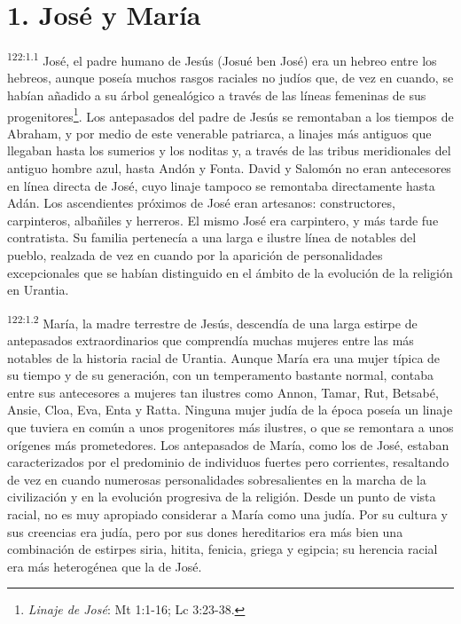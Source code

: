 \section*{1. José y María}
\par 
\textsuperscript{122:1.1} José, el padre humano de Jesús (Josué ben José) era un hebreo entre los hebreos, aunque poseía muchos rasgos raciales no judíos que, de vez en cuando, se habían añadido a su árbol genealógico a través de las líneas femeninas de sus progenitores\footnote{\textit{Linaje de José}: Mt 1:1-16; Lc 3:23-38.}. Los antepasados del padre de Jesús se remontaban a los tiempos de Abraham, y por medio de este venerable patriarca, a linajes más antiguos que llegaban hasta los sumerios y los noditas y, a través de las tribus meridionales del antiguo hombre azul, hasta Andón y Fonta. David y Salomón no eran antecesores en línea directa de José, cuyo linaje tampoco se remontaba directamente hasta Adán. Los ascendientes próximos de José eran artesanos: constructores, carpinteros, albañiles y herreros. El mismo José era carpintero, y más tarde fue contratista. Su familia pertenecía a una larga e ilustre línea de notables del pueblo, realzada de vez en cuando por la aparición de personalidades excepcionales que se habían distinguido en el ámbito de la evolución de la religión en Urantia.

\par 
\textsuperscript{122:1.2} María, la madre terrestre de Jesús, descendía de una larga estirpe de antepasados extraordinarios que comprendía muchas mujeres entre las más notables de la historia racial de Urantia. Aunque María era una mujer típica de su tiempo y de su generación, con un temperamento bastante normal, contaba entre sus antecesores a mujeres tan ilustres como Annon, Tamar, Rut, Betsabé, Ansie, Cloa, Eva, Enta y Ratta. Ninguna mujer judía de la época poseía un linaje que tuviera en común a unos progenitores más ilustres, o que se remontara a unos orígenes más prometedores. Los antepasados de María, como los de José, estaban caracterizados por el predominio de individuos fuertes pero corrientes, resaltando de vez en cuando numerosas personalidades sobresalientes en la marcha de la civilización y en la evolución progresiva de la religión. Desde un punto de vista racial, no es muy apropiado considerar a María como una judía. Por su cultura y sus creencias era judía, pero por sus dones hereditarios era más bien una combinación de estirpes siria, hitita, fenicia, griega y egipcia; su herencia racial era más heterogénea que la de José.

